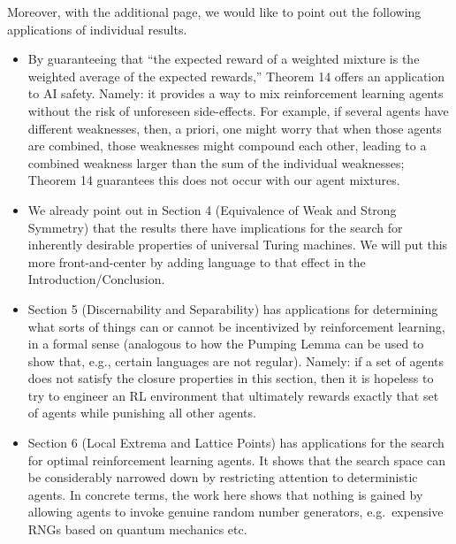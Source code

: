 \documentclass{article}
\begin{document}
Moreover, with the additional page, we would like to point out the following applications of individual results.
\begin{itemize}
    \item
    By guaranteeing that ``the expected reward of a weighted mixture is the weighted
    average of the expected rewards,'' Theorem 14 offers an application to AI safety.
    Namely: it provides a way to mix reinforcement learning agents without the risk of
    unforeseen side-effects. For example, if several agents have different weaknesses,
    then, a priori, one might worry that when those agents are combined, those weaknesses
    might compound each other, leading to a combined weakness larger than the sum of the
    individual weaknesses; Theorem 14
    guarantees this does not occur with our agent mixtures.
    \item
    We already point out in Section 4 (Equivalence of Weak and Strong Symmetry)
    that the results there
    have implications for the search for inherently desirable properties of universal Turing
    machines. We will put this more front-and-center by adding language to that effect in the
    Introduction/Conclusion.
    \item
    Section 5 (Discernability and Separability) has applications for determining what
    sorts of things can or cannot be incentivized by reinforcement learning, in a formal sense 
    (analogous to how the Pumping Lemma can be used to show that, e.g., certain
    languages are not regular). Namely: if a set of agents does not satisfy the
    closure properties in this
    section, then it is hopeless to try to engineer an RL environment that ultimately rewards
    exactly that set of agents while punishing all other agents.
    \item
    Section 6 (Local Extrema and Lattice Points) has applications for the search for
    optimal reinforcement learning agents. It shows that the search space can be
    considerably narrowed down by restricting attention to deterministic agents. In concrete
    terms, the work here shows that nothing is gained by allowing agents to invoke
    genuine random number generators, e.g.\ expensive RNGs based on quantum mechanics etc.
\end{itemize}


\end{document}
